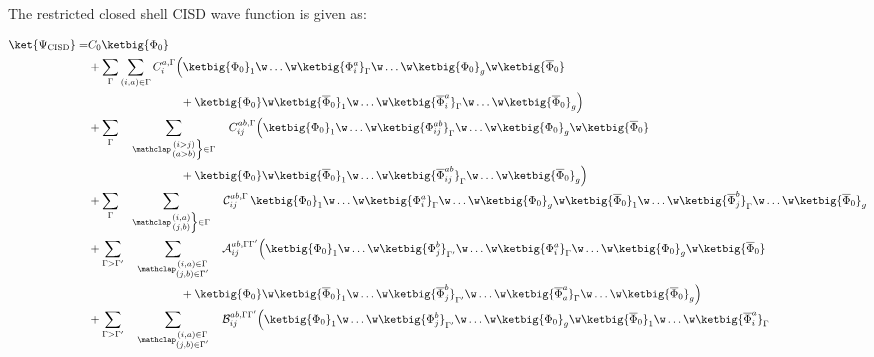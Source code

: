 \documentclass[a4paper,11pt]{article}
\begin{document}
The restricted closed shell CISD wave function is given as:

\newcommand{\Qquad}{\qquad\qquad\qquad\qquad}

\begin{equation}
  \label{eq:CISDwf}
  \begin{split}
    \ket{\Psi_\text{CISD}} =
    & C_0 \ketbig{\Phi_0}\\
    & + \sum_\irp\sum_{(i,a) \in \irp} C_{i}^{a, \irp}
    \Big(
    \ketbig{\Phi_0}_1
    \w \dots
    \w \ketbig{\Phi_i^a}_\irp
    \w \dots
    \w \ketbig{\Phi_0}_g
    \w \ketbig{\overline{\Phi}_0}
    \\ & \Qquad
    {} + \ketbig{\Phi_0}
    \w \ketbig{\overline{\Phi}_0}_1
    \w \dots
    \w \ketbig{\overline{\Phi}_i^a}_\irp
    \w \dots
    \w \ketbig{\overline{\Phi}_0}_g
    \Big)\\
    & + \sum_\irp\sumijabrestr C_{ij}^{ab, \irp}
    \Big(
    \ketbig{\Phi_0}_1
    \w \dots
    \w \ketbig{\Phi_{ij}^{ab}}_\irp
    \w \dots
    \w \ketbig{\Phi_0}_g
    \w \ketbig{\overline{\Phi}_0}
    \\ & \Qquad
    {} + \ketbig{\Phi_0}
    \w \ketbig{\overline{\Phi}_0}_1
    \w \dots
    \w \ketbig{\overline{\Phi}_{ij}^{ab}}_\irp
    \w \dots
    \w \ketbig{\overline{\Phi}_0}_g
    \Big)\\
    & + \sum_\irp \sumijabfull \Dss_{ij}^{ab, \irp} \,
    \ketbig{\Phi_0}_1
    \w \dots
    \w \ketbig{\Phi_{i}^{a}}_\irp
    \w \dots
    \w \ketbig{\Phi_0}_g
    \w \ketbig{\overline{\Phi}_0}_1
    \w \dots
    \w \ketbig{\overline{\Phi}_{j}^{b}}_\irp
    \w \dots
    \w \ketbig{\overline{\Phi}_0}_g\\
    & + \sum_{\irp > \irpP} \sumijabmix \Dmixaa_{ij}^{ab, \irp\irpP}
    \Big(
    \ketbig{\Phi_0}_1
    \w \dots
    \w \ketbig{\Phi_{j}^{b}}_\irpP
    \w \dots
    \w \ketbig{\Phi_{i}^{a}}_\irp
    \w \dots
    \w \ketbig{\Phi_0}_g
    \w \ketbig{\overline{\Phi}_0}
    \\ & \Qquad
    {} + \ketbig{\Phi_0}
    \w \ketbig{\overline{\Phi}_0}_1
    \w \dots
    \w \ketbig{\overline{\Phi}_{j}^{b}}_\irpP
    \w \dots
    \w \ketbig{\overline{\Phi}_{a}^{a}}_\irp
    \w \dots
    \w \ketbig{\overline{\Phi}_0}_g
    \Big)\\
    & + \sum_{\irp > \irpP} \sumijabmix \Dmixab_{ij}^{ab, \irp\irpP}
    \Big(
    \ketbig{\Phi_0}_1
    \w \dots
    \w \ketbig{\Phi_{j}^{b}}_\irpP
    \w \dots
    \w \ketbig{\Phi_0}_g
    \w \ketbig{\overline{\Phi}_0}_1
    \w \dots
    \w \ketbig{\overline{\Phi}_{i}^{a}}_\irp

\end{split}
\end{equation}
\end{document}
